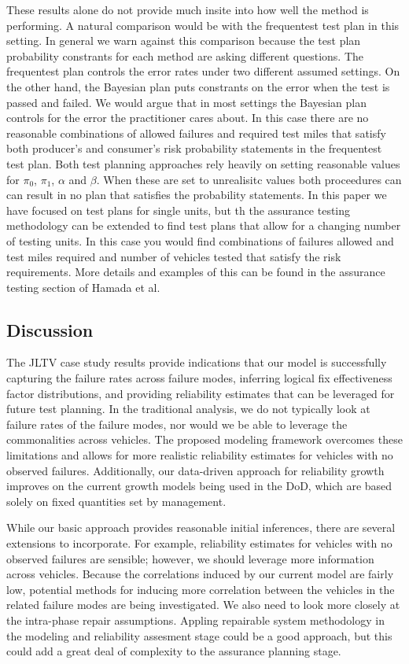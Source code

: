 \documentclass[12pt]{article}
\begin{document}
These results alone do not provide much insite into how well the method is
performing. A natural comparison would be with the frequentest test plan in this
setting.  In general  we warn against this comparison because the test plan
probability constrants for each  method are asking different questions.  The
frequentest plan controls the error rates  under two different assumed settings.
On the other hand, the Bayesian plan puts constrants  on the error when the test
is passed and failed.  We would argue that in most settings  the Bayesian plan
controls for the error the practitioner cares about.  In this case there are no
reasonable combinations of allowed failures and required test miles  that
satisfy both producer's and consumer's risk probability statements in the
frequentest test plan.
Both test planning approaches rely heavily on setting reasonable values for
$\pi_0$, $\pi_1$, $\alpha$ and $\beta$.   When these are set to unrealisitc
values both proceedures can can result in no plan that satisfies the probability
statements.  In this paper we have focused on test plans for single units, but
th the assurance testing methodology can be extended to find test plans that
allow for a changing number of testing units.  In this case you would find
combinations of failures allowed and test miles required and number of vehicles
tested that satisfy the risk requirements. More details and examples of this can
be found in the assurance testing section of Hamada et al. ~\cite{ref5}

\subsection{Discussion}
The JLTV case study results provide indications that our model is successfully
capturing the failure rates across failure modes, inferring logical fix
effectiveness factor distributions, and providing reliability estimates that can
be leveraged for future test planning. In the traditional analysis, we do not
typically look at failure rates of the failure modes, nor would we be able to
leverage the commonalities across vehicles. The proposed modeling framework
overcomes these limitations and allows for more realistic reliability estimates
for vehicles with no observed failures. Additionally, our data-driven approach
for reliability growth improves on the current growth models being used in the
DoD, which are based solely on fixed quantities set by management.

While our basic approach provides reasonable initial inferences, there are
several extensions to incorporate. For example, reliability estimates for
vehicles with no observed failures are sensible; however, we should leverage
more information across vehicles. Because the correlations induced by our
current model are fairly low, potential methods for inducing more correlation
between the vehicles in the related failure modes are being investigated. We
also need to look more closely at the intra-phase repair assumptions.  Appling
repairable system  methodology in the modeling and reliability assesment stage
could be a good approach, but this could  add a great deal of complexity to the
assurance planning stage.
\end{document}
